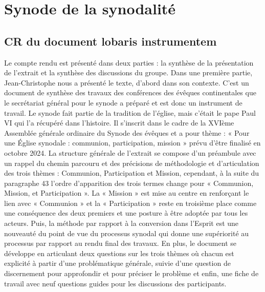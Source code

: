 \chapter{Synode de la synodalité}


\section{CR du document lobaris instrumentem}


 





Le compte rendu est présenté dans deux parties : la synthèse de la présentation de l’extrait et la synthèse des discussions du groupe.
Dans une première partie, Jean-Christophe nous a présenté le texte, d’abord dans son contexte. C’est un document de synthèse des travaux des conférences des évêques continentales que le secrétariat général pour le synode a préparé et est donc un instrument de travail.  Le synode fait partie de la tradition de l’église, mais c’était le pape Paul VI qui l’a récupéré dans l’histoire. Il s’inscrit dans le cadre de la XVIème Assemblée générale ordinaire du Synode des évêques et a pour thème : « Pour une Église synodale : communion, participation, mission » prévu d’être finalisé en octobre 2024. La structure générale de l’extrait se compose d’un préambule avec un rappel du chemin parcouru et des précisions de méthodologie et d’articulation des trois thèmes : Communion, Participation et Mission, cependant, à la suite du paragraphe 43 l’ordre d’apparition des trois termes change pour « Communion, Mission, et Participation ». La « Mission » est mise au centre en renforçant le lien avec « Communion » et la « Participation » reste en troisième place comme une conséquence des deux premiers et une posture à être adoptée par tous les acteurs. Puis, la méthode par rapport à la conversion dans l’Esprit est une nouveauté du point de vue du processus synodal qui donne une supériorité au processus par rapport au rendu final des travaux. En plus, le document se développe en articulant deux questions sur les trois thèmes où chacun est explicité à partir d’une problématique générale, suivie d’une question de discernement pour approfondir et pour préciser le problème et enfin, une fiche de travail avec neuf questions guides pour les discussions des participants. 

